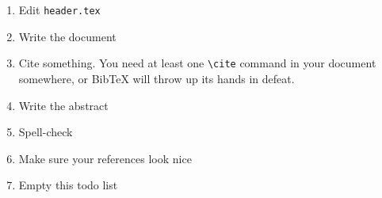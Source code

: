 \begin{enumerate}
\item Edit \verb+header.tex+
\item Write the document
\item Cite something. \cite[p.~999]{source} You need at least one \verb+\cite+ command in your document somewhere, or BibTeX will throw up its hands in defeat.
\item Write the abstract
\item Spell-check
\item Make sure your references look nice
\item Empty this todo list
\end{enumerate}
